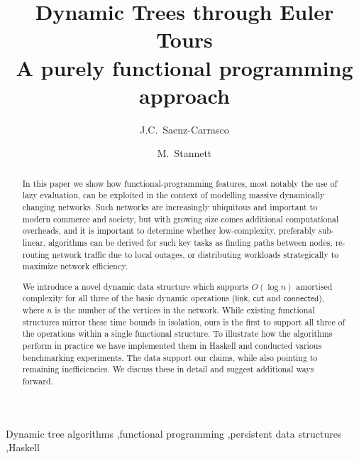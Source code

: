 \documentclass{elsarticle}
\newcommand{\MATHSF}[1]{\ensuremath{\mathsf{#1}}\xspace}
\newcommand{\link}{\MATHSF{link}}
\newcommand{\cut}{\MATHSF{cut}}
\newcommand{\connected}{\MATHSF{connected}}
\begin{document}
\title{Dynamic Trees through Euler Tours\\%
\large{A purely functional programming approach}}

\author{J.C.~Saenz-Carrasco}

\author{M.~Stannett}

\address{Department of Computer Science,\\
Regent Court, 211 Portobello,\\
Sheffield S1 4DP, United Kingdom}


\begin{abstract}
In this paper we show how functional-programming features, most notably the use of lazy evaluation, can be exploited in the context of modelling massive dynamically changing networks. Such networks are increasingly ubiquitous and important to modern commerce and society, but with growing size comes additional computational overheads, and it is important to determine whether low-complexity, preferably sub-linear, algorithms can be derived for such key tasks as finding paths between nodes, re-routing network traffic due to local outages, or distributing workloads strategically to maximize network efficiency.

We introduce a novel dynamic data structure which supports $O(\log n)$ amortised complexity for all three of the basic dynamic operations (\link, \cut and \connected), where $n$ is the number of the vertices in the network. While existing functional structures mirror these time bounds in isolation, ours is the first to support all three of the operations within a single functional structure. To illustrate how the algorithms perform in practice we have implemented them in Haskell and conducted various benchmarking experiments. The data support our claims, while also pointing to remaining inefficiencies. We discuss these in detail and suggest additional ways forward.
\end{abstract}

\begin{keyword}
Dynamic tree algorithms \sep functional programming \sep persistent data structures \sep Haskell
\end{keyword}


\maketitle






%
 
 
 
 

\end{document}
